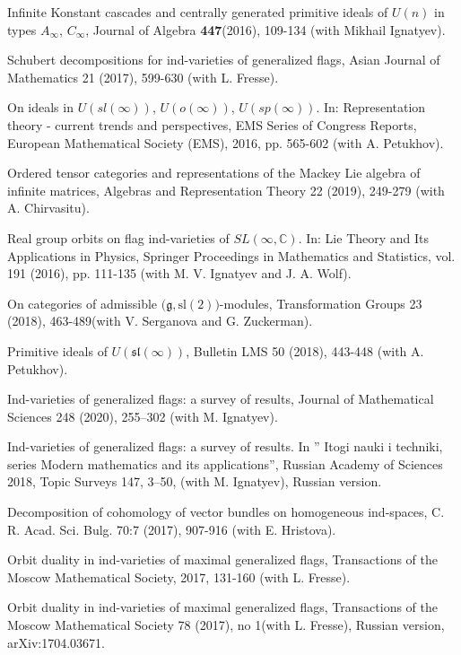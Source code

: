 \documentclass[11pt]{amsart}
\begin{document}
\myss \label{65.} Infinite Konstant cascades and centrally generated primitive ideals of $U(n)$ in types $A_\infty$, $C_\infty$, Journal of Algebra \textbf{447}(2016), 109-134 (with Mikhail Ignatyev).

\myss \label{66.} Schubert decompositions for ind-varieties of generalized flags, Asian Journal of Mathematics 21 (2017), 599-630 (with L. Fresse).

\myss \label{67.} On ideals in $U(sl(\infty))$, $U(o(\infty))$, $U(sp(\infty))$. In: Representation theory - current trends and perspectives, EMS Series of Congress Reports, European Mathematical Society (EMS), 2016, pp. 565-602 (with A. Petukhov).

\myss \label{68.} Ordered tensor categories and representations of the Mackey Lie algebra of infinite matrices, Algebras and Representation Theory 22 (2019), 249-279 (with A. Chirvasitu).

\myss \label{69.} Real group orbits on flag ind-varieties of $SL(\infty,\mathbb{C})$. In: Lie Theory and Its Applications in Physics, Springer Proceedings in Mathematics and Statistics, vol. 191 (2016), pp. 111-135 (with M. V. Ignatyev and J. A. Wolf).

\myss \label{70.}  On categories of admissible \(\big(\mathfrak{g},\mathrm{sl}(2)\big)\)-modules, Transformation Groups 23 (2018), 463-489(with V. Serganova and G. Zuckerman).

\myss \label{71.}  Primitive ideals of $U(\mathfrak{sl}(\infty))$, Bulletin LMS 50 (2018), 443-448 (with A. Petukhov).

\myss \label{72.}  Ind-varieties of generalized flags: a survey of results, Journal of Mathematical Sciences 248 (2020), 255–302 (with M. Ignatyev).

\myss \label{72'.} Ind-varieties of generalized flags: a survey of results. In '' Itogi nauki i techniki, series Modern mathematics and its applications'',  Russian Academy of Sciences 2018, Topic Surveys 147, 3--50, (with M. Ignatyev), Russian version.

\myss \label{73.} Decomposition of cohomology of vector bundles on homogeneous ind-spaces, C. R. Acad. Sci. Bulg. 70:7 (2017), 907-916 (with E. Hristova).

\myss \label{74.} Orbit duality in ind-varieties of maximal generalized flags, Transactions of the Moscow Mathematical Society, 2017, 131-160 (with L. Fresse).

\myss \label{74'.} Orbit duality in ind-varieties of maximal generalized flags, Transactions of the Moscow Mathematical Society 78 (2017), no 1(with L. Fresse), Russian version, arXiv:1704.03671.
\end{document}
